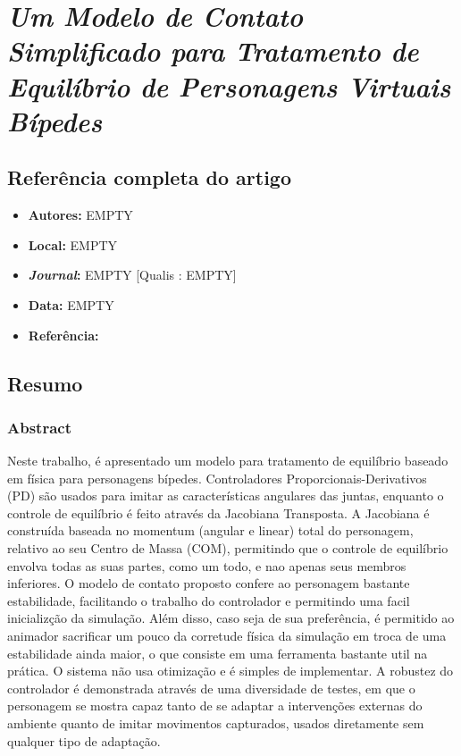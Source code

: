 \section{\textit{Um Modelo de Contato Simplificado para
Tratamento de Equilíbrio de Personagens Virtuais
Bípedes}}

\subsection{Referência completa do artigo}

\begin{itemize}
  \item \textbf{Autores:} EMPTY
  \item \textbf{Local:} EMPTY
  \item \textbf{\textit{Journal}:} EMPTY [Qualis : EMPTY]
  \item \textbf{Data:} EMPTY
  \item \textbf{Referência:} 
\end{itemize}


\subsection{Resumo}

\subsubsection{Abstract}

Neste trabalho, é apresentado um modelo para tratamento de equilíbrio baseado em física para personagens
bípedes. Controladores Proporcionais-Derivativos (PD) são usados para imitar as características angulares das juntas, enquanto o controle de equilíbrio é feito através da Jacobiana Transposta. A Jacobiana é construída baseada no momentum (angular e linear) total do personagem, relativo ao seu Centro de Massa (COM), permitindo que o controle de equilíbrio envolva todas as suas partes, como um todo, e nao apenas seus membros inferiores. O modelo de contato proposto confere ao personagem bastante estabilidade, facilitando o trabalho do controlador e permitindo uma facil inicializção da simulação. Além disso, caso seja de sua preferência, é permitido ao animador sacrificar um pouco da corretude física da simulação em troca de uma estabilidade ainda maior, o que consiste em uma ferramenta bastante util na prática. O sistema não usa otimização e é simples de implementar. A robustez do controlador é demonstrada através de uma diversidade de testes, em que o personagem se mostra capaz tanto de se adaptar a intervenções externas do ambiente quanto de imitar movimentos capturados, usados diretamente sem qualquer tipo de adaptação.

